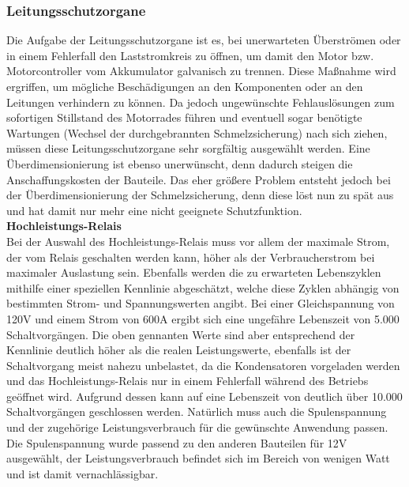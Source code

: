 \newpage



\subsubsection{Leitungsschutzorgane}
Die Aufgabe der Leitungsschutzorgane ist es, bei unerwarteten Überströmen oder in einem Fehlerfall den Laststromkreis zu öffnen, um damit den Motor bzw. Motorcontroller vom Akkumulator galvanisch zu trennen. Diese Maßnahme wird ergriffen, um mögliche Beschädigungen an den Komponenten oder an den Leitungen verhindern zu können. Da jedoch ungewünschte Fehlauslösungen zum sofortigen Stillstand des Motorrades führen und eventuell sogar benötigte Wartungen (Wechsel der durchgebrannten Schmelzsicherung) nach sich ziehen, müssen diese Leitungsschutzorgane sehr sorgfältig ausgewählt werden. Eine Überdimensionierung ist ebenso unerwünscht, denn dadurch steigen die Anschaffungskosten der Bauteile. Das eher größere Problem entsteht jedoch bei der Überdimensionierung der Schmelzsicherung, denn diese löst nun zu spät aus und hat damit nur mehr eine nicht geeignete Schutzfunktion. 
\\[5mm]

\textbf{Hochleistungs-Relais}
\\[2mm]
Bei der Auswahl des Hochleistungs-Relais muss vor allem der maximale Strom, der vom Relais geschalten werden kann, höher als der Verbraucherstrom bei maximaler Auslastung sein. Ebenfalls werden die zu erwarteten Lebenszyklen mithilfe einer speziellen Kennlinie abgeschätzt, welche diese Zyklen abhängig von bestimmten Strom- und Spannungswerten angibt. Bei einer Gleichspannung von 120V und einem Strom von 600A ergibt sich eine ungefähre Lebenszeit von 5.000 Schaltvorgängen. Die oben gennanten Werte sind aber entsprechend der Kennlinie deutlich höher als die realen Leistungswerte, ebenfalls ist der Schaltvorgang meist nahezu unbelastet, da die Kondensatoren vorgeladen werden und das Hochleistungs-Relais nur in einem Fehlerfall während des Betriebs geöffnet wird. Aufgrund dessen kann auf eine Lebenszeit von deutlich über 10.000 Schaltvorgängen geschlossen werden. Natürlich muss auch die Spulenspannung und der zugehörige Leistungsverbrauch für die gewünschte Anwendung passen. Die Spulenspannung wurde passend zu den anderen Bauteilen für 12V ausgewählt, der Leistungsverbrauch befindet sich im Bereich von wenigen Watt und ist damit vernachlässigbar.
\\[5mm]

